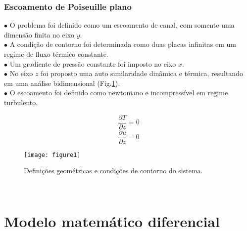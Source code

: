 \documentclass[xcolor=dvipsnames,10pt,aspectratio=169]{beamer}
\begin{document}
		\begin{frame}
			\frametitle{Escoamento de Poiseuille plano}
			$\bullet$ O problema foi definido como um escoamento de canal, com somente uma dimensão finita no eixo $y$. \\
			$\bullet$ A condição de contorno foi determinada como duas placas infinitas em um regime de fluxo térmico constante.\\
			$\bullet$ Um gradiente de pressão constante foi imposto no eixo $x$.\\
			$\bullet$ No eixo $z$ foi proposto uma auto similaridade dinâmica e térmica, resultando em uma análise bidimensional (Fig.\ref{figure.1}). \\
			$\bullet$ O escoamento foi definido como newtoniano e incompressível em regime turbulento.\\
			\begin{minipage}[h!]{0.3\textwidth}
				\begin{equation*}
				 \frac{\partial T }{\partial z} = 0
				\end{equation*}
				\begin{equation*}
				\frac{\partial u }{\partial z} = 0
				\end{equation*}
			\end{minipage}
			\begin{minipage}[h!]{0.5\textwidth}
			\begin{figure}[h!]
				\centering
				\texttt{[image: figure1]}
				\caption{Definições geométricas e condições de contorno do sistema.}
				\label{figure.1}
			\end{figure}
			\end{minipage}
			\\
		\end{frame}
	
	

	
	\section{Modelo matemático diferencial}
	
	
	
	
		
\end{document}
